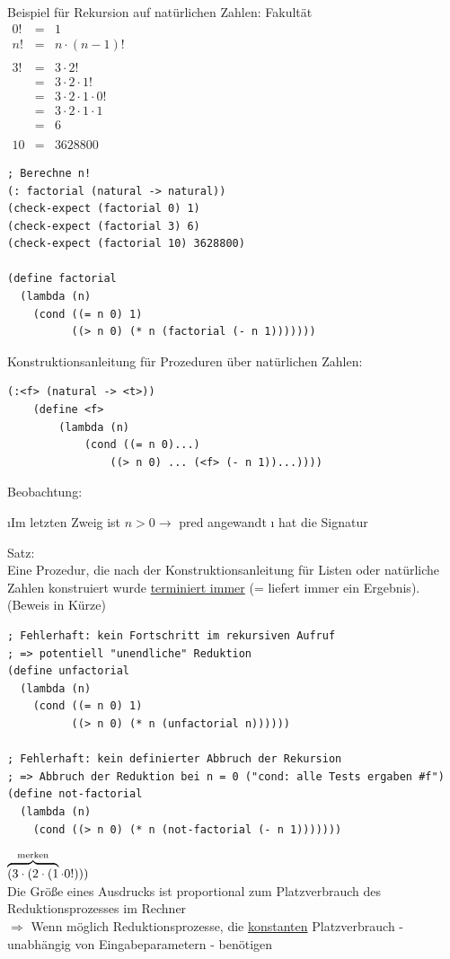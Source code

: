 Beispiel für Rekursion auf natürlichen Zahlen: Fakultät\\$
\begin{array}{rcl}
0! &=& 1\\
n! &=& n \cdot (n -1)!\\
&\\
3! &=& 3 \cdot 2!\\
&=& 3 \cdot 2 \cdot 1!\\
&=& 3 \cdot 2 \cdot 1 \cdot 0!\\
&=& 3 \cdot 2 \cdot 1 \cdot 1\\
&=& 6\\
&\\
10 &=& 3628800
\end{array}$\bigskip \\
\begin{lstlisting}[frame =single]
; Berechne n!
(: factorial (natural -> natural))
(check-expect (factorial 0) 1)
(check-expect (factorial 3) 6)
(check-expect (factorial 10) 3628800)

(define factorial
  (lambda (n)
    (cond ((= n 0) 1)
          ((> n 0) (* n (factorial (- n 1)))))))
\end{lstlisting}
Konstruktionsanleitung für Prozeduren über natürlichen Zahlen:\\
\begin{lstlisting}
(:<f> (natural -> <t>))
	(define <f>
		(lambda (n)
			(cond ((= n 0)...)
				((> n 0) ... (<f> (- n 1))...))))
\end{lstlisting}
Beobachtung:\\
\begin{enumerate}[-]
\i Im letzten Zweig ist $n > 0 \rightarrow$ pred angewandt
\i {} hat die Signatur \argt{}
\end{enumerate}
Satz:\\
Eine Prozedur, die nach der Konstruktionsanleitung für Listen oder natürliche Zahlen konstruiert wurde \uline{terminiert immer} (= liefert immer ein Ergebnis).\\
(Beweis in Kürze)\\
\begin{lstlisting}[frame=single]
; Fehlerhaft: kein Fortschritt im rekursiven Aufruf
; => potentiell "unendliche" Reduktion
(define unfactorial
  (lambda (n)
    (cond ((= n 0) 1)
          ((> n 0) (* n (unfactorial n))))))

; Fehlerhaft: kein definierter Abbruch der Rekursion
; => Abbruch der Reduktion bei n = 0 ("cond: alle Tests ergaben #f")
(define not-factorial
  (lambda (n)
    (cond ((> n 0) (* n (not-factorial (- n 1)))))))
\end{lstlisting}
$\overbrace{(3 \cdot (2 \cdot (1}^{\text{merken}} \cdot 0!)))$\\
Die Grö\ss e eines Ausdrucks ist proportional zum Platzverbrauch des Reduktionsprozesses im Rechner\\
$\Rightarrow$ Wenn möglich Reduktionsprozesse, die \uline{konstanten} Platzverbrauch - unabhängig von Eingabeparametern - benötigen